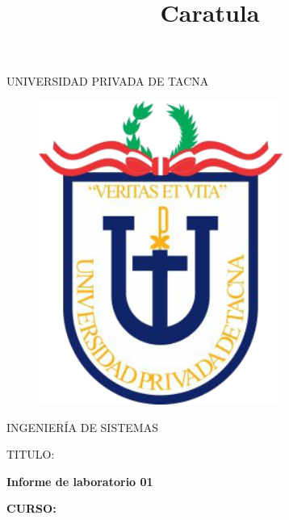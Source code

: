 \documentclass[12pt,letterpaper]{article}
\begin{document}
%


\title{Caratula}

\begin{titlepage}
\begin{center}
\large{UNIVERSIDAD PRIVADA DE TACNA}\\
\vspace*{-0.025in}
\begin{figure}[htb]
\begin{center}
\includegraphics[width=8cm]{./Imagenes/logo}
\end{center}
\end{figure}
\vspace*{0.15in}
INGENIERÍA DE SISTEMAS  \\

\vspace*{0.5in}
\begin{large}
TITULO:\\
\end{large}

\vspace*{0.1in}
\begin{Large}
\textbf{Informe de laboratorio 01} \\
\end{Large}

\vspace*{0.3in}
\begin{Large}
\textbf{CURSO:} \\
\end{Large}


\end{center}
\end{titlepage}
\end{document}

